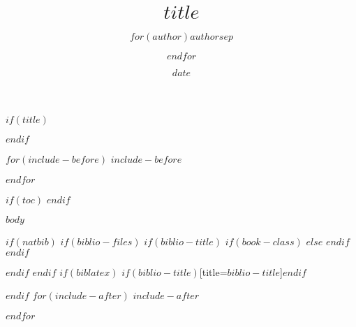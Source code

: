 \documentclass[$if(fontsize)$$fontsize$,$endif$$if(lang)$$lang$,$endif$,openright,twoside,mcrownvopaper,
showtrims
]{$documentclass$}
\title{$title$}
\author{$for(author)$$author$$sep$ \and $endfor$}
\date{$date$}
\begin{document}
\pagestyle{empty}

$if(title)$
\pretitle{\begin{center}\LARGE\scshape}
\maketitle
\thispagestyle{empty}
$endif$

$for(include-before)$
$include-before$

$endfor$

\cleartooddpage


\frontmatter

$if(toc)$
{
\hypersetup{linkcolor=black}
  \renewcommand*{\contentsname}{Sommaire}
  \tableofcontents*
}
$endif$


\pagestyle{fancy}

$body$





$if(natbib)$
$if(biblio-files)$
$if(biblio-title)$
$if(book-class)$
\renewcommand\bibname{$biblio-title$}
$else$
\renewcommand\refname{$biblio-title$}
$endif$
$endif$


$endif$
$endif$
$if(biblatex)$
\printbibliography$if(biblio-title)$[title=$biblio-title$]$endif$

$endif$
$for(include-after)$
$include-after$

$endfor$


\end{document}

